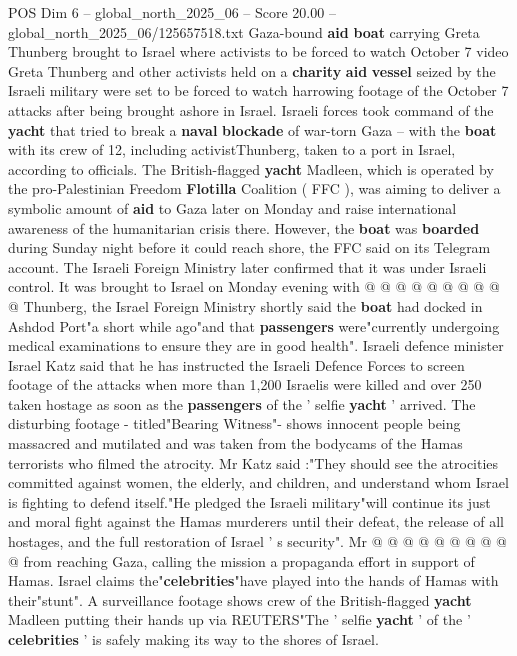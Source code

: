\begin{textsample}{POS Dim 6 – global\_north\_2025\_06 – Score 20.00 – global\_north\_2025\_06/125657518.txt}  \label{ex:f6_pos_022}
Gaza-bound \textbf{aid} \textbf{boat} carrying Greta Thunberg brought to Israel where activists to be forced to watch October 7 video Greta Thunberg and other activists held on a \textbf{charity} \textbf{aid} \textbf{vessel} seized by the Israeli military were set to be forced to watch harrowing footage of the October 7 attacks after being brought ashore in Israel.
Israeli forces took command of the \textbf{yacht} that tried to break a \textbf{naval} \textbf{blockade} of war-torn Gaza -- with the \textbf{boat} with its crew of 12, including activistThunberg, taken to a port in Israel, according to officials.
The British-flagged \textbf{yacht} Madleen, which is operated by the pro-Palestinian Freedom \textbf{Flotilla} Coalition ( FFC ), was aiming to deliver a symbolic amount of \textbf{aid} to Gaza later on Monday and raise international awareness of the humanitarian crisis there.
However, the \textbf{boat} was \textbf{boarded} during Sunday night before it could reach shore, the FFC said on its Telegram account.
The Israeli Foreign Ministry later confirmed that it was under Israeli control.
It was brought to Israel on Monday evening with @ @ @ @ @ @ @ @ @ @ Thunberg, the Israel Foreign Ministry shortly said the \textbf{boat} had docked in Ashdod Port"a short while ago"and that \textbf{passengers} were"currently undergoing medical examinations to ensure they are in good health".
Israeli defence minister Israel Katz said that he has instructed the Israeli Defence Forces to screen footage of the attacks when more than 1,200 Israelis were killed and over 250 taken hostage as soon as the \textbf{passengers} of the ' selfie \textbf{yacht} ' arrived.
The disturbing footage - titled"Bearing Witness"- shows innocent people being massacred and mutilated and was taken from the bodycams of the Hamas terrorists who filmed the atrocity.
Mr Katz said :"They should see the atrocities committed against women, the elderly, and children, and understand whom Israel is fighting to defend itself."He pledged the Israeli military"will continue its just and moral fight against the Hamas murderers until their defeat, the release of all hostages, and the full restoration of Israel ' s security".
Mr @ @ @ @ @ @ @ @ @ @ from reaching Gaza, calling the mission a propaganda effort in support of Hamas.
Israel claims the"\textbf{celebrities}"have played into the hands of Hamas with their"stunt".
A surveillance footage shows crew of the British-flagged \textbf{yacht} Madleen putting their hands up via REUTERS"The ' selfie \textbf{yacht} ' of the ' \textbf{celebrities} ' is safely making its way to the shores of Israel.

\end{textsample}
